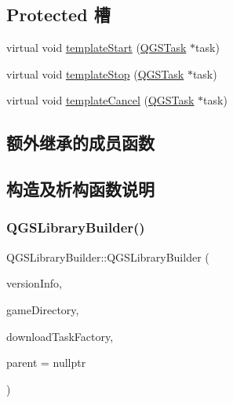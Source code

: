 \subsection*{Protected 槽}
\begin{DoxyCompactItemize}
\item 
virtual void \mbox{\hyperlink{class_q_g_s_library_builder_afd5fc93b83244183e632bf0ef19c5521}{template\+Start}} (\mbox{\hyperlink{class_q_g_s_task}{Q\+G\+S\+Task}} $\ast$task)
\item 
virtual void \mbox{\hyperlink{class_q_g_s_library_builder_ac97299cee0e5e32ec9d5ee6cd15521f7}{template\+Stop}} (\mbox{\hyperlink{class_q_g_s_task}{Q\+G\+S\+Task}} $\ast$task)
\item 
virtual void \mbox{\hyperlink{class_q_g_s_library_builder_a3d9754a0b0e88e111ff0b2134cc92676}{template\+Cancel}} (\mbox{\hyperlink{class_q_g_s_task}{Q\+G\+S\+Task}} $\ast$task)
\end{DoxyCompactItemize}
\subsection*{额外继承的成员函数}


\subsection{构造及析构函数说明}
\mbox{\label{class_q_g_s_library_builder_a3c397317f0d2a4c70b224fc2df8b0323}} 
\subsubsection{\texorpdfstring{Q\+G\+S\+Library\+Builder()}{QGSLibraryBuilder()}\hspace{0.1cm}{\footnotesize\ttfamily [1/3]}}
{\footnotesize\ttfamily Q\+G\+S\+Library\+Builder\+::\+Q\+G\+S\+Library\+Builder (\begin{DoxyParamCaption}\item[{\mbox{\hyperlink{class_q_g_s_game_version_info}{Q\+G\+S\+Game\+Version\+Info}} \&}]{version\+Info,  }\item[{\mbox{\hyperlink{class_q_g_s_game_directory}{Q\+G\+S\+Game\+Directory}} $\ast$}]{game\+Directory,  }\item[{\mbox{\hyperlink{class_q_g_s_download_task_factory}{Q\+G\+S\+Download\+Task\+Factory}} $\ast$}]{download\+Task\+Factory,  }\item[{Q\+Object $\ast$}]{parent = {\ttfamily nullptr} }\end{DoxyParamCaption})}

